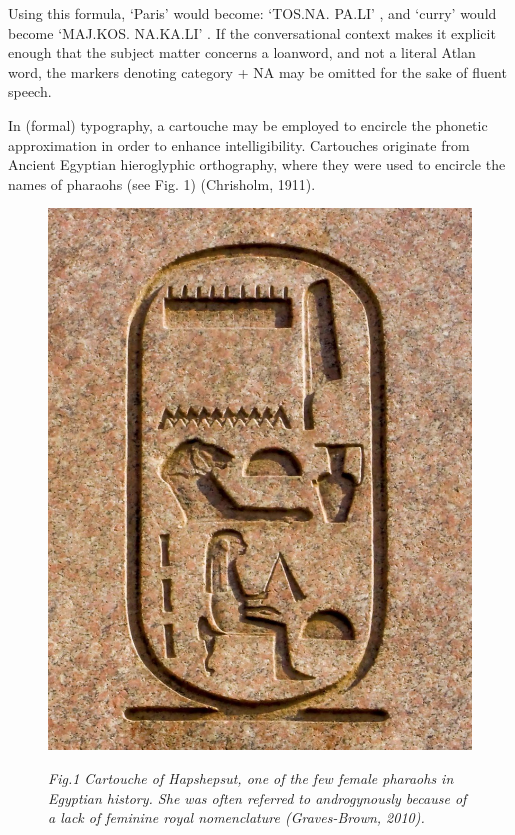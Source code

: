 Using this formula, ‘Paris’ would become: ‘TOS.NA. PA.LI’ \cartouche{}, and ‘curry’ would become ‘MAJ.KOS. NA.KA.LI’ \cartouche{}. If the conversational context makes it explicit enough that the subject matter concerns a loanword, and not a literal Atlan word, the markers denoting category + NA may be omitted for the sake of fluent speech.  

In (formal) typography, a cartouche may be employed to encircle the phonetic approximation in order to enhance intelligibility. Cartouches originate from Ancient Egyptian hieroglyphic orthography, where they were used to encircle the names of pharaohs (see Fig. 1) (Chrisholm, 1911).  

\begin{figure}
\includegraphics[scale=0.1]{./Images/Cartouche.jpeg}

	{\footnotesize \it Fig.1 Cartouche of Hapshepsut, one of the few female pharaohs in Egyptian history. She was often referred to androgynously because of a lack of feminine royal nomenclature (Graves-Brown, 2010). }

\end{figure}
 

